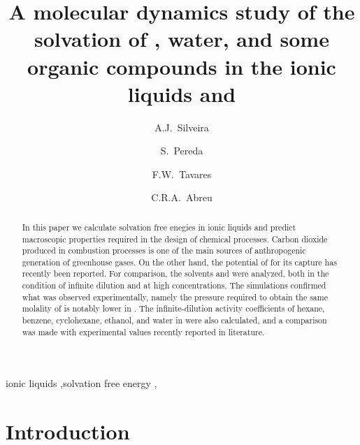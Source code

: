 \documentclass[3p,twocolumn]{elsarticle}
\begin{document}
\begin{frontmatter}

\title{A molecular dynamics study of the solvation of , water, and some organic compounds in the ionic liquids \ce{[emim][B(CN)_4]} and \ce{[emim][NTf_2]}}

\author[rvt]{A.J.~Silveira}
\author[rvt]{S.~Pereda}
\author[focal,els]{F.W.~Tavares}
\author[focal]{C.R.A.~Abreu}

\address[rvt]{Planta Piloto de Ingenier\'ia Qu\'imica, PLAPIQUI, Universidad Nacional del Sur,Camino La Carrindanga Km 7-CC: 717, Bah\'ia Blanca, Argentina}
\address[focal]{Chemical Engineering Department, Escola de Qu\'imica, Universidade Federal do Rio de Janeiro,Rio de Janeiro, RJ 21941-909, Brazil}
\address[els]{COPPE, Universidade Federal do Rio de Janeiro, Rio de Janeiro, RJ 21941-909, Brazil}


\begin{abstract}
In this paper we calculate solvation free enegies in ionic liquids and predict macroscopic properties required in the design of chemical processes. Carbon dioxide produced in combustion processes is one of the main sources of anthropogenic generation of greenhouse gases. On the other hand, the potential of \ce{[emim][B(CN)_4]} for its capture has recently been reported. For comparison, the solvents \ce{[emim][B(CN)_4]} and \ce{[emim][NTf_2]} were analyzed, both in the condition of infinite dilution and at high concentrations. The simulations confirmed what was observed experimentally, namely the pressure required to obtain the same molality of  is notably lower in \ce{[emim][B(CN)_4]}. The infinite-dilution activity coefficients of hexane, benzene, cyclohexane, ethanol, and water in \ce{[emim][B(CN)_4]} were also calculated, and a comparison was made with experimental values recently reported in literature.
\end{abstract}

\begin{keyword}
ionic liquids \sep solvation free energy \sep  {} 
\end{keyword}

\end{frontmatter}

\linenumbers

\section{Introduction}
\end{document}

